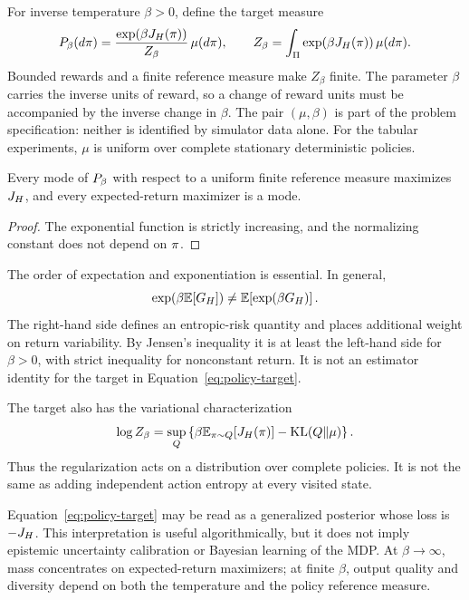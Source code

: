 \label{sec:target}

For inverse temperature \(\beta>0\), define the target measure
\begin{equation}
  P_{\beta}(d\pi)
  = \frac{\exp\!\left(\beta J_H(\pi)\right)}
         {Z_{\beta}}\,\mu(d\pi),
  \qquad
  Z_{\beta}
  = \int_{\Pi}
      \exp\!\left(\beta J_H(\pi)\right)\mu(d\pi).
  \label{eq:policy-target}
\end{equation}
Bounded rewards and a finite reference measure make \(Z_\beta\) finite.
The parameter \(\beta\) carries the inverse units of reward, so a change of
reward units must be accompanied by the inverse change in \(\beta\).
The pair \((\mu,\beta)\) is part of the problem specification: neither is
identified by simulator data alone.  For the tabular experiments, \(\mu\) is
uniform over complete stationary deterministic policies.

\begin{proposition}
Every mode of \(P_{\beta}\) with respect to a uniform finite reference measure
maximizes \(J_H\), and every expected-return maximizer is a mode.
\end{proposition}

\begin{proof}
The exponential function is strictly increasing, and the normalizing constant
does not depend on \(\pi\).
\end{proof}

The order of expectation and exponentiation is essential. In general,
\begin{equation}
  \exp\!\left(\beta\mathbb{E}[G_H]\right)
  \neq
  \mathbb{E}\!\left[\exp(\beta G_H)\right].
  \label{eq:order-matters}
\end{equation}
The right-hand side defines an entropic-risk quantity and places additional
weight on return variability. By Jensen's inequality it is at least the
left-hand side for \(\beta>0\), with strict inequality for nonconstant return.
It is not an estimator identity for the target in
Equation~\eqref{eq:policy-target}.

The target also has the variational characterization
\begin{equation}
  \log Z_\beta
  = \sup_Q
    \left\{
      \beta\mathbb{E}_{\pi\sim Q}[J_H(\pi)]
      -\operatorname{KL}(Q\|\mu)
    \right\}.
  \label{eq:gibbs-variational}
\end{equation}
Thus the regularization acts on a distribution over complete policies. It is
not the same as adding independent action entropy at every visited state.

Equation~\eqref{eq:policy-target} may be read as a generalized posterior whose
loss is \(-J_H\).  This interpretation is useful algorithmically,
but it does not imply epistemic uncertainty calibration or Bayesian learning of
the MDP.  At \(\beta\to\infty\), mass concentrates on expected-return
maximizers; at finite \(\beta\), output quality and diversity depend on both the
temperature and the policy reference measure.
